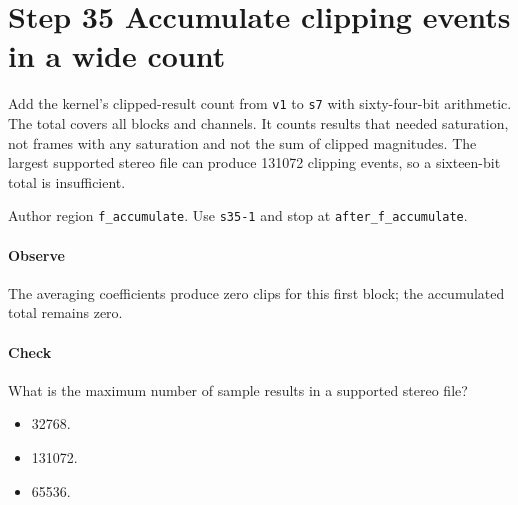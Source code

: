 \section{Step 35 Accumulate clipping events in a wide count}\label{pcm-wav-s35}
Add the kernel's clipped-result count from \texttt{v1} to \texttt{s7} with sixty-four-bit arithmetic. The total covers all blocks and channels. It counts results that needed saturation, not frames with any saturation and not the sum of clipped magnitudes. The largest supported stereo file can produce 131072 clipping events, so a sixteen-bit total is insufficient.

Author region \texttt{f\_accumulate}. Use \texttt{s35-1} and stop at \texttt{after\_f\_accumulate}.

\paragraph{Observe} The averaging coefficients produce zero clips for this first block; the accumulated total remains zero.

\paragraph{Check} What is the maximum number of sample results in a supported stereo file?
\begin{itemize}
\item[A.] 32768.
\item[B.] 131072.
\item[C.] 65536.
\end{itemize}
